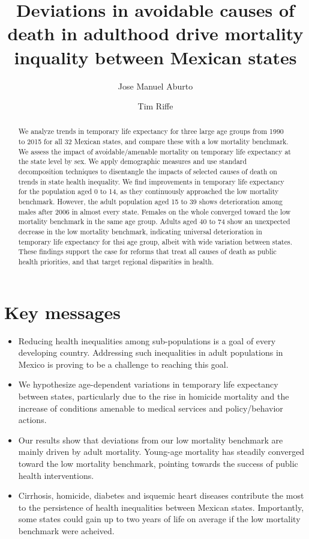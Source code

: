 \documentclass{article}
\title{Deviations in avoidable causes of death in adulthood drive mortality
inquality between Mexican states}
\author[1,2]{Jose Manuel Aburto}
\author[2]{Tim Riffe}
\affil[1]{European Doctoral School of Demography}
\affil[2]{Max Planck Institute for Demographic Research}
\begin{document}
\maketitle

\begin{abstract}
We analyze trends in temporary life expectancy for three large age groups from
1990 to 2015 for all 32 Mexican states, and compare these with a low
mortality benchmark. We assess the impact of avoidable/amenable mortality on
temporary life expectancy at the state level by sex. We apply demographic
measures and use standard decomposition techniques to disentangle the impacts
of selected causes of death on trends in state health inequality.
We find improvements in temporary life expectancy for the population aged 0 to
14, as they continuously approached the low mortality benchmark. However, the
adult population aged 15 to 39 shows deterioration among males after 2006 in
almost every state. Females on the whole converged toward the low mortality
benchmark in the same age group. Adults aged 40 to 74 show an unexpected
decrease in the low mortality benchmark, indicating universal deterioration in
temporary life expectancy for thsi age group, albeit with wide variation
between states. These findings support the case for reforms that treat all
causes of death as public health priorities, and that target regional
disparities in health.
​\end{abstract}

\section*{Key messages}
\begin{itemize}
\item Reducing health inequalities among sub-populations is a goal of every
developing country. Addressing such inequalities in adult populations in
Mexico is proving to be a challenge to reaching this goal.
\item We hypothesize age-dependent variations in temporary life expectancy
between states, particularly due to the rise in homicide mortality and the
increase of conditions amenable to medical services and policy/behavior actions.
\item Our results show that deviations from our low mortality benchmark are
mainly driven by adult mortality. Young-age mortality has steadily converged
toward the low mortality benchmark, pointing towards the success of public
health interventions.
\item Cirrhosis, homicide, diabetes and isquemic heart diseases contribute the
most to the persistence of health inequalities between Mexican states.
Importantly, some states could gain up to two years of life on average if the
low mortality benchmark were acheived.
\end{itemize}
\end{document}
